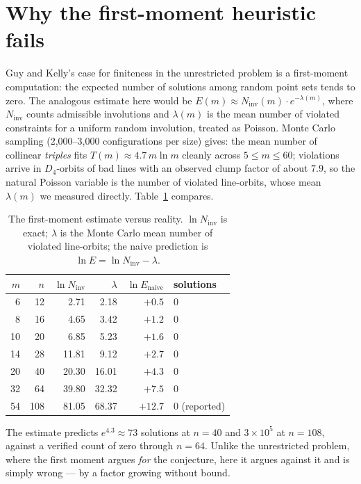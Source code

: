 \documentclass[11pt]{article}
\theoremstyle{remark}
\begin{document}
\section{Why the first-moment heuristic fails}\label{sec:heuristic}

Guy and Kelly's case for finiteness in the unrestricted problem is a
first-moment computation:
the expected number of solutions among random point sets tends to zero.
The analogous estimate here would be
$E(m)\approx N_{\mathrm{inv}}(m)\cdot e^{-\lambda(m)}$,
where $N_{\mathrm{inv}}$ counts admissible involutions and $\lambda(m)$ is
the mean number of violated constraints for a uniform random involution,
treated as Poisson.
Monte Carlo sampling (2{,}000--3{,}000 configurations per size) gives:
the mean number of collinear \emph{triples} fits
$T(m)\approx 4.7\,m\ln m$ cleanly across $5\le m\le 60$;
violations arrive in $D_4$-orbits of bad lines with an observed clump factor
of about $7.9$,
so the natural Poisson variable is the number of violated line-orbits,
whose mean $\lambda(m)$ we measured directly.
Table~\ref{tab:moment} compares.

\begin{table}[t]
\centering
\caption{The first-moment estimate versus reality.
$\ln N_{\mathrm{inv}}$ is exact; $\lambda$ is the Monte Carlo mean number of
violated line-orbits; the naive prediction is
$\ln E = \ln N_{\mathrm{inv}} - \lambda$.}
\label{tab:moment}
\begin{tabular}{rrrrrl}
\toprule
$m$ & $n$ & $\ln N_{\mathrm{inv}}$ & $\lambda$ & $\ln E_{\text{naive}}$ &
solutions\\
\midrule
 6 &  12 &  2.71 &  2.18 & $+0.5$ & 0\\
 8 &  16 &  4.65 &  3.42 & $+1.2$ & 0\\
10 &  20 &  6.85 &  5.23 & $+1.6$ & 0\\
14 &  28 & 11.81 &  9.12 & $+2.7$ & 0\\
20 &  40 & 20.30 & 16.01 & $+4.3$ & 0\\
32 &  64 & 39.80 & 32.32 & $+7.5$ & 0\\
54 & 108 & 81.05 & 68.37 & $+12.7$ & 0 (reported)\\
\bottomrule
\end{tabular}
\end{table}

The estimate predicts $e^{4.3}\approx 73$ solutions at $n=40$ and
$3\times10^{5}$ at $n=108$,
against a verified count of zero through $n=64$.
Unlike the unrestricted problem,
where the first moment argues \emph{for} the conjecture,
here it argues against it and is simply wrong ---
by a factor growing without bound.
\end{document}
